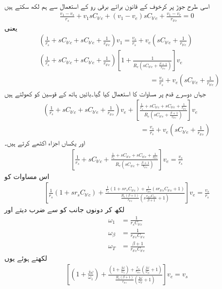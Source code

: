 اسی طرح جوڑ  پر کرخوف کے قانون برائے برقی رو کے استعمال سے ہم لکھ سکتے ہیں
\begin{align*}
\frac{v_1-v_s}{r_s}+v_1 sC_{b'c} +\left(v_1-v_e\right) sC_{b'e}+\frac{v_1-v_e}{r_{b'e}}=0
\end{align*}
یعنی
\begin{align*}
&\left(\frac{1}{r_s}+sC_{b'c}+sC_{b'e}+\frac{1}{r_{b'e}} \right) v_1=\frac{v_s}{r_s}+v_e \left(sC_{b'e}+\frac{1}{r_{b'e}} \right)\\
&\left(\frac{1}{r_s}+sC_{b'c}+sC_{b'e}+\frac{1}{r_{b'e}} \right) \left[1+\frac{1}{R_e \left(sC_{b'e}+\frac{\beta+1}{r_{b'e}}\right)}\right] v_e\\
&\hspace{6cm}\qquad{}=\frac{v_s}{r_s}+v_e \left(sC_{b'e}+\frac{1}{r_{b'e}} \right)
\end{align*}
جہاں دوسرے قدم پر مساوات  کا استعمال کیا گیا۔بائیں ہاتھ کے قوسین کو کھولتے ہیں
\begin{align*}
\left(\frac{1}{r_s}+sC_{b'c}+sC_{b'e}+\frac{1}{r_{b'e}} \right) v_e +\left[\frac{\frac{1}{r_s}+sC_{b'c}+sC_{b'e}+\frac{1}{r_{b'e}}}{R_e \left(sC_{b'e}+\frac{\beta+1}{r_{b'e}} \right)}\right] v_e\\
\hspace{6cm} =\frac{v_s}{r_s}+v_e \left(sC_{b'e}+\frac{1}{r_{b'e}} \right)
\end{align*}
اور یکساں اجزاء اکٹھے کرتے ہیں۔
\begin{align*}
\left[\frac{1}{r_s}+sC_{b'c}+\frac{\frac{1}{r_s}+sC_{b'c}+sC_{b'e}+\frac{1}{r_{b'e}}}{R_e \left(sC_{b'e}+\frac{\beta+1}{r_{b'e}} \right)}\right] v_e=\frac{v_s}{r_s}
\end{align*}
اس مساوات کو
\begin{align*}
\left[\frac{1}{r_s}\left(1+s r_s C_{b'c}\right)+\frac{\frac{1}{r_s}\left(1+s r_s C_{b'c}\right)+\frac{1}{r_{b'e}}\left(s r_{b'e}C_{b'e}+1\right)}{\frac{R_e\left(\beta+1 \right)}{r_{b'e}} \left(s \frac{r_{b'e}C_{b'e}}{\beta+1}+1 \right)}\right] v_e=\frac{v_s}{r_s}
\end{align*}
لکھ کر دونوں جانب کو  سے ضرب دیتے اور 
\begin{align}
\omega_1&=\frac{1}{r_s C_{b'c}}\\
\omega_{\beta}&=\frac{1}{r_{b'e} C_{b'e}}\\
\omega_T&=\frac{\beta+1}{r_{b'e}C_{b'e}}
\end{align}
لکھتے ہوئے یوں
\begin{align*}
\left[\left(1+\frac{j \omega}{\omega_1}\right)+\frac{\left(1+\frac{j \omega}{\omega_1}\right)+\frac{r_s}{r_{b'e}}\left(\frac{j \omega}{\omega_{\beta}}+1\right)}{\frac{R_e\left(\beta+1 \right)}{r_{b'e}} \left(\frac{j \omega}{\omega_T}+1 \right)}\right] v_e=v_s
\end{align*}
